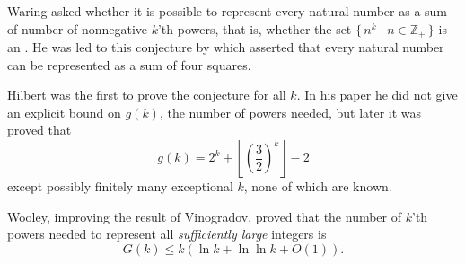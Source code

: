 \documentclass[12pt]{article}
\begin{document}
Waring asked whether it is possible to represent every natural number as a sum of  number of nonnegative $k$'th powers, that is, whether the set $\{\,n^k \mid n \in \mathbb{Z_+}\,\}$ is an . He was led to this conjecture by  which asserted that every natural number can be represented as a sum of four squares. 

Hilbert \cite{cite:hilbert_waring} was the first to prove the conjecture for all $k$. In his paper he did not give an explicit bound on $g(k)$, the number of powers needed, but later it was proved that 
\begin{equation*}
g(k)=2^k+\left\lfloor\left(\frac{3}{2}\right)^k\right\rfloor-2
\end{equation*}
except possibly finitely many exceptional $k$, none of which are known.

Wooley\cite{cite:wooley_waring}, improving the result of Vinogradov\cite{cite:vinogradov_waringG}, proved that the number of $k$'th powers needed to represent all \emph{sufficiently large} integers is
\begin{equation*}
G(k)\leq k (\ln k + \ln \ln k + O(1)).
\end{equation*}
\end{document}
